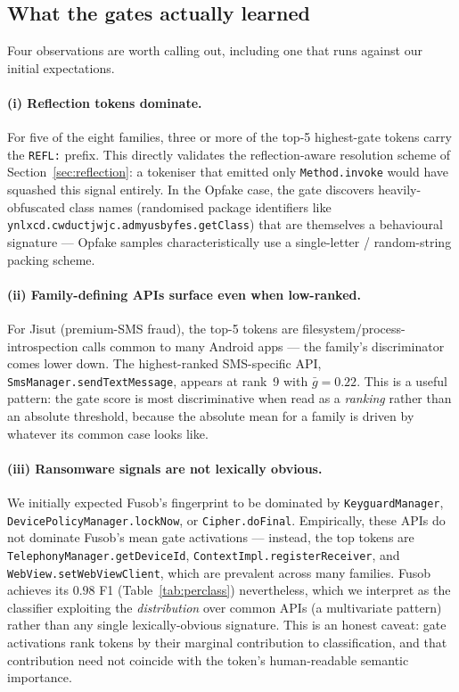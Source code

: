 \subsection{What the gates actually learned}

Four observations are worth calling out, including one that runs
against our initial expectations.

\paragraph{(i) Reflection tokens dominate.} For five of the eight
families, three or more of the top-5 highest-gate tokens carry the
\texttt{REFL:} prefix. This directly validates the reflection-aware
resolution scheme of Section~\ref{sec:reflection}: a tokeniser that
emitted only \texttt{Method.invoke} would have squashed this signal
entirely. In the Opfake case, the gate discovers heavily-obfuscated
class names (randomised package identifiers like
\texttt{ynlxcd.cwductjwjc.admyusbyfes.getClass}) that are themselves
a behavioural signature — Opfake samples characteristically use a
single-letter / random-string packing scheme.

\paragraph{(ii) Family-defining APIs surface even when low-ranked.}
For Jisut (premium-SMS fraud), the top-5 tokens are
filesystem/process-introspection calls common to many Android apps
--- the family's discriminator comes lower down. The highest-ranked
SMS-specific API, \texttt{SmsManager.sendTextMessage}, appears at
rank~9 with $\bar{g} = 0.22$. This is a useful pattern: the gate
score is most discriminative when read as a \emph{ranking} rather
than an absolute threshold, because the absolute mean for a family
is driven by whatever its common case looks like.

\paragraph{(iii) Ransomware signals are not lexically obvious.} We
initially expected Fusob's fingerprint to be dominated by
\texttt{KeyguardManager}, \texttt{DevicePolicyManager.lockNow}, or
\texttt{Cipher.doFinal}. Empirically, these APIs do not dominate
Fusob's mean gate activations --- instead, the top tokens are
\texttt{TelephonyManager.getDeviceId},
\texttt{ContextImpl.registerReceiver}, and
\texttt{WebView.setWebViewClient}, which are prevalent across many
families. Fusob achieves its $0.98$ F1 (Table~\ref{tab:perclass})
nevertheless, which we interpret as the classifier exploiting the
\emph{distribution} over common APIs (a multivariate pattern) rather
than any single lexically-obvious signature. This is an honest
caveat: gate activations rank tokens by their marginal contribution
to classification, and that contribution need not coincide with the
token's human-readable semantic importance.

